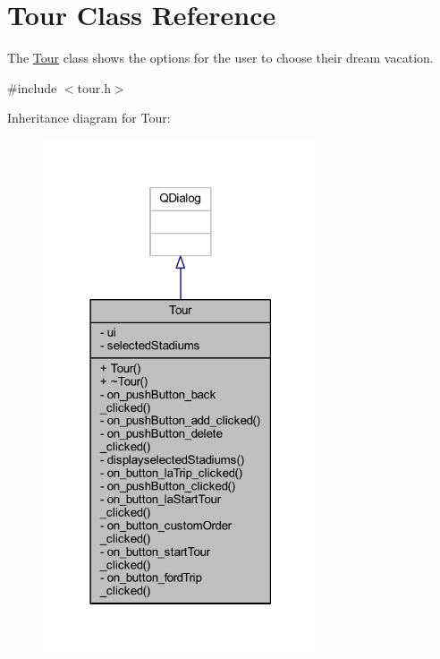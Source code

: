 \hypertarget{class_tour}{}\section{Tour Class Reference}
\label{class_tour}


The \hyperlink{class_tour}{Tour} class shows the options for the user to choose their dream vacation.  




{\ttfamily \#include $<$tour.\+h$>$}



Inheritance diagram for Tour\+:
\nopagebreak
\begin{figure}[H]
\begin{center}
\leavevmode
\includegraphics[width=231pt]{class_tour__inherit__graph}
\end{center}
\end{figure}


